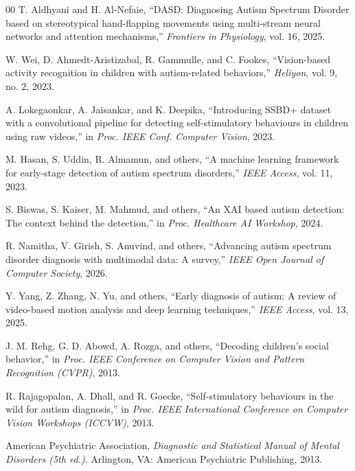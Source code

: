 \documentclass[conference]{IEEEtran}
\begin{document}
\begin{thebibliography}{00}
 T. Aldhyani and H. Al-Nefaie, ``DASD: Diagnosing Autism Spectrum Disorder based on stereotypical hand-flapping movements using multi-stream neural networks and attention mechanisms,'' \textit{Frontiers in Physiology}, vol. 16, 2025.

 W. Wei, D. Ahmedt-Aristizabal, R. Gammulle, and C. Fookes, ``Vision-based activity recognition in children with autism-related behaviors,'' \textit{Heliyon}, vol. 9, no. 2, 2023.

 A. Lokegaonkar, A. Jaisankar, and K. Deepika, ``Introducing SSBD+ dataset with a convolutional pipeline for detecting self-stimulatory behaviours in children using raw videos,'' in \textit{Proc. IEEE Conf. Computer Vision}, 2023.

 M. Hasan, S. Uddin, R. Almamun, and others, ``A machine learning framework for early-stage detection of autism spectrum disorders,'' \textit{IEEE Access}, vol. 11, 2023.

 S. Biswas, S. Kaiser, M. Mahmud, and others, ``An XAI based autism detection: The context behind the detection,'' in \textit{Proc. Healthcare AI Workshop}, 2024.

 R. Namitha, V. Girish, S. Anuvind, and others, ``Advancing autism spectrum disorder diagnosis with multimodal data: A survey,'' \textit{IEEE Open Journal of Computer Society}, 2026.

 Y. Yang, Z. Zhang, N. Yu, and others, ``Early diagnosis of autism: A review of video-based motion analysis and deep learning techniques,'' \textit{IEEE Access}, vol. 13, 2025.

 J. M. Rehg, G. D. Abowd, A. Rozga, and others, ``Decoding children's social behavior,'' in \textit{Proc. IEEE Conference on Computer Vision and Pattern Recognition (CVPR)}, 2013.

 R. Rajagopalan, A. Dhall, and R. Goecke, ``Self-stimulatory behaviours in the wild for autism diagnosis,'' in \textit{Proc. IEEE International Conference on Computer Vision Workshops (ICCVW)}, 2013.

 American Psychiatric Association, \textit{Diagnostic and Statistical Manual of Mental Disorders (5th ed.)}. Arlington, VA: American Psychiatric Publishing, 2013.

\end{thebibliography}
\end{document}
